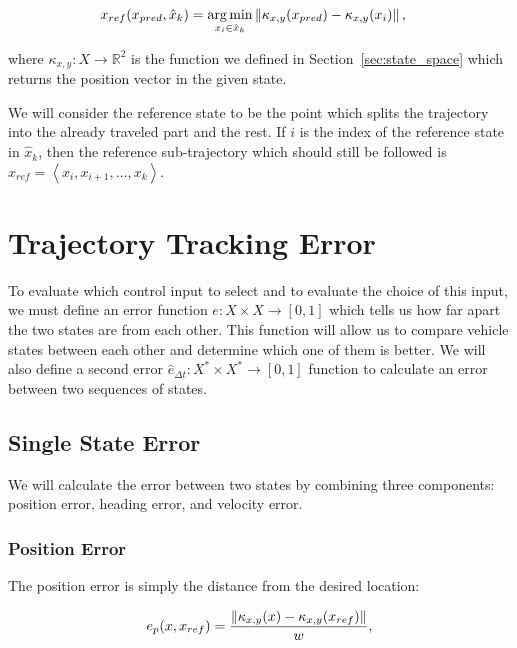 \begin{equation}
\begin{aligned}
x_{ref}(x_{pred}, \hat{x}_k)&=\operatorname*{arg\,min}_{x_i \in \hat{x}_k} \left\lVert\kappa_{x,y}(x_{pred})-\kappa_{x,y}(x_i)\right\rVert,
\end{aligned}
\end{equation}
	
where $\kappa_{x,y}: X\rightarrow \mathbb{R}^2$ is the function we defined in Section~\ref{sec:state_space} which returns the position vector in the given state.

We will consider the reference state to be the point which splits the trajectory into the already traveled part and the rest. If $i$ is the index of the reference state in $\hat{x}_k$, then the reference sub-trajectory which should still be followed is $\hat{x}_{ref}=\left\langle x_i, x_{i+1}, \ldots, x_k \right\rangle$.

\section{Trajectory Tracking Error}
\label{sec:trajectory-tracking-error}

To evaluate which control input to select and to evaluate the choice of this input, we must define an error function $e: X\times X\rightarrow \left[0, 1\right]$ which tells us how far apart the two states are from each other. This function will allow us to compare vehicle states between each other and determine which one of them is better. We will also define a second error $\hat{e}_{\Delta t}: X^*\times X^*\rightarrow \left[0, 1\right]$ function to calculate an error between two sequences of states.

\subsection{Single State Error}

We will calculate the error between two states by combining three components: position error, heading error, and velocity error.

\subsubsection{Position Error}

The position error is simply the distance from the desired location:

\begin{equation}
	\label{eq:position_error}
	e_p(x, x_{ref})=\dfrac{\left\lVert\kappa_{x,y}(x)-\kappa_{x,y}(x_{ref})\right\rVert}{w},
\end{equation}

